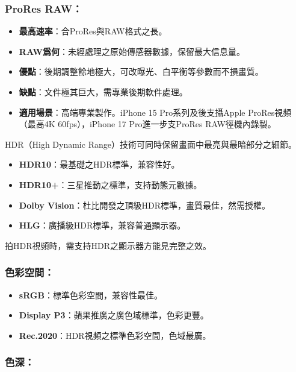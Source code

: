 \subsubsection*{ProRes RAW：}

\begin{itemize}
  \item \textbf{最高速率}：合ProRes與RAW格式之長。
  \item \textbf{RAW爲何}：未經處理之原始傳感器數據，保留最大信息量。
  \item \textbf{優點}：後期調整餘地極大，可改曝光、白平衡等參數而不損畫質。
  \item \textbf{缺點}：文件極其巨大，需專業後期軟件處理。
  \item \textbf{適用場景}：高端專業製作。iPhone 15 Pro系列及後支攝Apple ProRes視頻（最高4K 60fps），iPhone 17 Pro進一步支ProRes RAW徑機內錄製。
\end{itemize}


HDR（High Dynamic Range）技術可同時保留畫面中最亮與最暗部分之細節。

\begin{itemize}
  \item \textbf{HDR10}：最基礎之HDR標準，兼容性好。
  \item \textbf{HDR10+}：三星推動之標準，支持動態元數據。
  \item \textbf{Dolby Vision}：杜比開發之頂級HDR標準，畫質最佳，然需授權。
  \item \textbf{HLG}：廣播級HDR標準，兼容普通顯示器。
\end{itemize}

拍HDR視頻時，需支持HDR之顯示器方能見完整之效。


\subsubsection*{色彩空間：}

\begin{itemize}
  \item \textbf{sRGB}：標準色彩空間，兼容性最佳。
  \item \textbf{Display P3}：蘋果推廣之廣色域標準，色彩更豐。
  \item \textbf{Rec.2020}：HDR視頻之標準色彩空間，色域最廣。
\end{itemize}

\subsubsection*{色深：}

